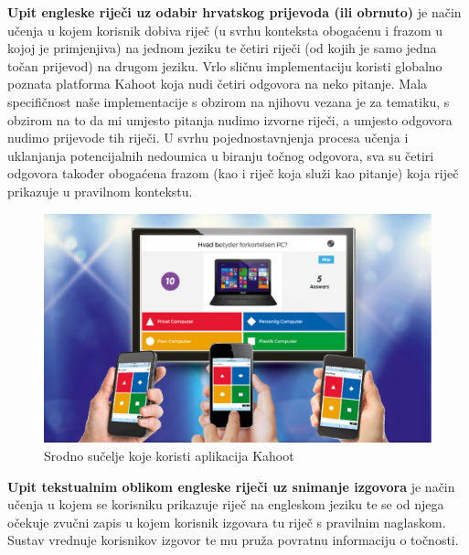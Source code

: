 		\textbf{Upit engleske riječi uz odabir hrvatskog prijevoda (ili obrnuto)} je način učenja u kojem korisnik dobiva riječ (u svrhu konteksta obogaćenu i frazom u kojoj je primjenjiva) na jednom jeziku te četiri riječi (od kojih je samo jedna točan prijevod) na drugom jeziku. Vrlo sličnu implementaciju koristi globalno poznata platforma Kahoot koja nudi četiri odgovora na neko pitanje. Mala specifičnost naše implementacije s obzirom na njihovu vezana je za tematiku, s obzirom na to da mi umjesto pitanja nudimo izvorne riječi, a umjesto odgovora nudimo prijevode tih riječi.
		\newline
		\newline
		U svrhu pojednostavnjenja procesa učenja i uklanjanja potencijalnih nedoumica u biranju točnog odgovora, sva su četiri odgovora također obogaćena frazom (kao i riječ koja služi kao pitanje) koja riječ prikazuje u pravilnom kontekstu.
		\\

		\begin{figure}[H]
			\centering
			\includegraphics[width=0.8\linewidth]{slike/Kahoot.png}
			\caption{Srodno sučelje koje koristi aplikacija Kahoot}
			\label{fig:rijecnik}
		\end{figure}
		
		\textbf{Upit tekstualnim oblikom engleske riječi uz snimanje izgovora} je način učenja u kojem se korisniku prikazuje riječ na engleskom jeziku te se od njega očekuje zvučni zapis u kojem korisnik izgovara tu riječ s pravilnim naglaskom. Sustav vrednuje korisnikov izgovor te mu pruža povratnu informaciju o točnosti.
		\\

